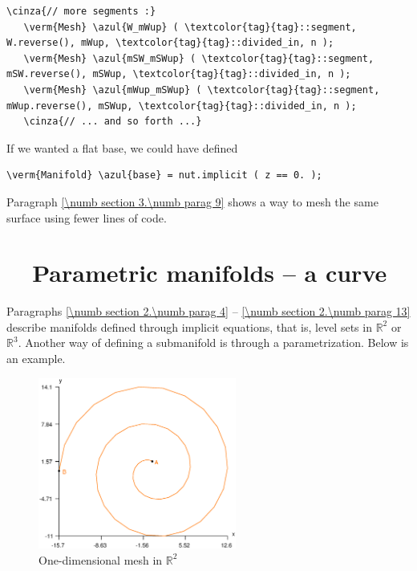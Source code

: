 \begin{Verbatim}[commandchars=\\\{\},formatcom=\small\tt,frame=single,
   label=parag-\ref{\numb section 2.\numb parag 13}.cpp,rulecolor=\color{coment},
   baselinestretch=0.94,framesep=2mm]
   \cinza{// more segments :}
   \verm{Mesh} \azul{W_mWup} ( \textcolor{tag}{tag}::segment, W.reverse(), mWup, \textcolor{tag}{tag}::divided_in, n );
   \verm{Mesh} \azul{mSW_mSWup} ( \textcolor{tag}{tag}::segment, mSW.reverse(), mSWup, \textcolor{tag}{tag}::divided_in, n );
   \verm{Mesh} \azul{mWup_mSWup} ( \textcolor{tag}{tag}::segment, mWup.reverse(), mSWup, \textcolor{tag}{tag}::divided_in, n );
   \cinza{// ... and so forth ...}
\end{Verbatim}

If we wanted a flat base, we could have defined

\begin{Verbatim}[commandchars=\\\{\},formatcom=\small\tt,baselinestretch=0.94]
   \verm{Manifold} \azul{base} = nut.implicit ( z == 0. );
\end{Verbatim}

Paragraph \ref{\numb section 3.\numb parag 9} shows a way to mesh the same surface using
fewer lines of code.


\section{~~Parametric manifolds -- a curve}\label{\numb section 2.\numb parag 14}

Paragraphs \ref{\numb section 2.\numb parag 4} -- \ref{\numb section 2.\numb parag 13} describe
manifolds defined through implicit equations, that is, level sets in $ \mathbb{R}^2 $ or
$ \mathbb{R}^3 $.
Another way of defining a submanifold is through a parametrization.
Below is an example.

\begin{figure}[ht] \centering
  \includegraphics[width=65mm]{spiral}
  \caption{One-dimensional mesh in $ {\mathbb R}^2 $}
\end{figure}

